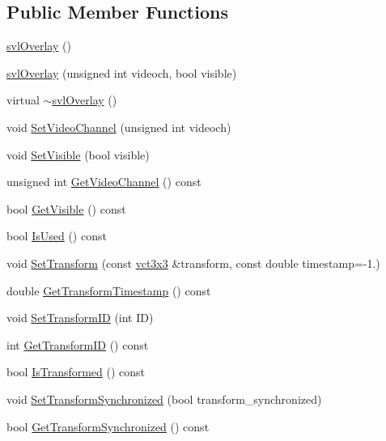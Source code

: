 \subsection*{Public Member Functions}
\begin{DoxyCompactItemize}
\item 
\hyperlink{classsvl_overlay_a1751015ce9ab4481c6c0b784646f52ae}{svl\-Overlay} ()
\item 
\hyperlink{classsvl_overlay_acb6375e8a14fcc9950755df7e8b1cc57}{svl\-Overlay} (unsigned int videoch, bool visible)
\item 
virtual \hyperlink{classsvl_overlay_af77fa3e84af43b56d2048bc94a82e661}{$\sim$svl\-Overlay} ()
\item 
void \hyperlink{classsvl_overlay_a1f825df240cf6cf073691def775a5e02}{Set\-Video\-Channel} (unsigned int videoch)
\item 
void \hyperlink{classsvl_overlay_ab5d00f6df0bd72b15765b8a680fbf637}{Set\-Visible} (bool visible)
\item 
unsigned int \hyperlink{classsvl_overlay_a9d870d01cd68c2a76346d1df3d229d65}{Get\-Video\-Channel} () const 
\item 
bool \hyperlink{classsvl_overlay_ab417e9c5962f6b92e6747d5a267e2237}{Get\-Visible} () const 
\item 
bool \hyperlink{classsvl_overlay_a48b607d56401597b0d857c3ea51f008d}{Is\-Used} () const 
\item 
void \hyperlink{classsvl_overlay_a12b06247c4903537977bbb889eff2072}{Set\-Transform} (const \hyperlink{vct_fixed_size_matrix_types_8h_aac4a419dacf9282410675d42ebc86a7c}{vct3x3} \&transform, const double timestamp=-\/1.)
\item 
double \hyperlink{classsvl_overlay_a5a29fea925d5fdc52d03b784cf5481e3}{Get\-Transform\-Timestamp} () const 
\item 
void \hyperlink{classsvl_overlay_ace126d146b53be946159e77673e0afd5}{Set\-Transform\-I\-D} (int I\-D)
\item 
int \hyperlink{classsvl_overlay_a8afc560ef8d0943fccf888d22b8466e5}{Get\-Transform\-I\-D} () const 
\item 
bool \hyperlink{classsvl_overlay_a9f52d22f41d8f0001b59a6eb887d02b6}{Is\-Transformed} () const 
\item 
void \hyperlink{classsvl_overlay_aab9adce69f8ce3349ce12ae9f3de6c58}{Set\-Transform\-Synchronized} (bool transform\-\_\-synchronized)
\item 
bool \hyperlink{classsvl_overlay_acb9695d27f4439f889dde4272955d0bd}{Get\-Transform\-Synchronized} () const 
\end{DoxyCompactItemize}
